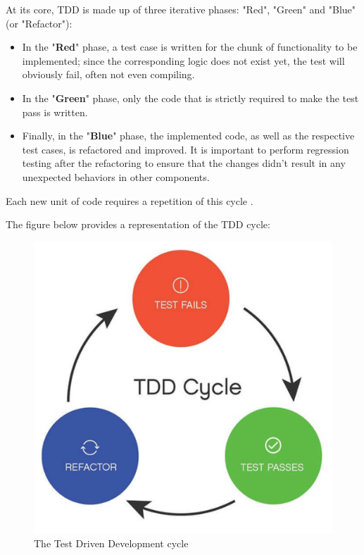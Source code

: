 At its core, TDD is made up of three iterative phases: "Red", "Green" and "Blue" (or "Refactor"):
\begin{itemize}
    \item In the "\textbf{Red}" phase, a test case is written for the chunk of functionality to be implemented; since the corresponding logic does not exist yet, the test will obviously fail, often not even compiling.
    \item In the "\textbf{Green}" phase, only the code that is strictly required to make the test pass is written.
    \item Finally, in the "\textbf{Blue}" phase, the implemented code, as well as the respective test cases, is refactored and improved. It is important to perform regression testing after the refactoring to ensure that the changes didn't result in any unexpected behaviors in other components.
\end{itemize}
Each new unit of code requires a repetition of this cycle \cite{GuidelinesTDD}.

The figure below provides a representation of the TDD cycle:
\begin{figure}[h]
    \centering
    \includegraphics[width=\linewidth]{figures/tdd_cycle.jpg}
    \caption{The Test Driven Development cycle}
    \label{tdd-cycle}
\end{figure}

